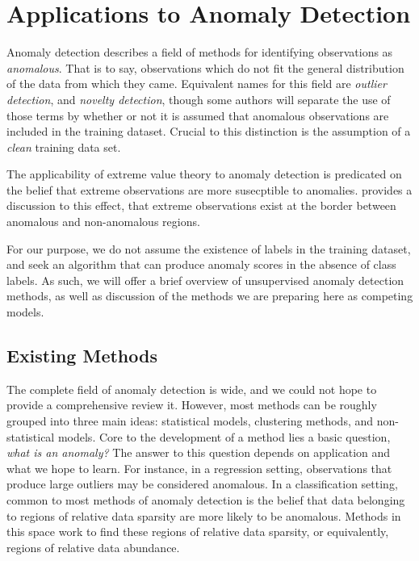\section{Applications to Anomaly Detection}
Anomaly detection describes a field of methods for identifying observations as \emph{anomalous}.  That
  is to say, observations which do not fit the general distribution of the data from which they came.
  Equivalent names for this field are \emph{outlier detection}, and \emph{novelty detection}, though
  some authors will separate the use of those terms by whether or not it is assumed that anomalous
  observations are included in the training dataset.  Crucial to this distinction is the assumption
  of a \emph{clean} training data set.

The applicability of extreme value theory to anomaly detection is predicated on the belief that
  extreme observations are more susecptible to anomalies.  \cite{goix2017} provides a discussion to
  this effect, that extreme observations exist at the border between anomalous and non-anomalous regions.

For our purpose, we do not assume the existence of labels in the training dataset, and seek an
  algorithm that can produce anomaly scores in the absence of class labels. As such, we will offer
  a brief overview of unsupervised anomaly detection methods, as well as discussion of the methods
  we are preparing here as competing models.

\subsection{Existing Methods}
The complete field of anomaly detection is wide, and we could not hope to provide a comprehensive review
  it.  However, most methods can be roughly grouped into three main ideas: statistical models, clustering
  methods, and non-statistical models. Core to the development of a method lies a basic question,
  \emph{what is an anomaly?}  The answer to this question depends on application and what we hope to
  learn.  For instance, in a regression setting, observations that produce large outliers may be considered
  anomalous.  In a classification setting, common to most methods of anomaly detection is the belief
  that data belonging to regions of relative data sparsity are more likely to be anomalous.  Methods in
  this space work to find these regions of relative data sparsity, or equivalently, regions of relative
  data abundance.

